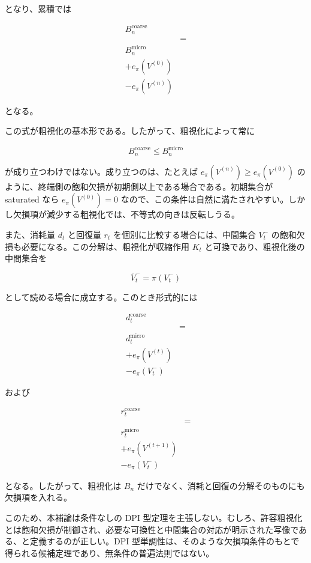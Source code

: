 \documentclass[12pt,a4paper]{article}
\begin{document}
となり、累積では

\[
\begin{aligned}
B_{n}^{\mathrm{coarse}} \\
&= \\
B_{n}^{\mathrm{micro}} \\
+ e_\pi(V^{(0)}) \\
- e_\pi(V^{(n)})
\end{aligned}
\]

となる。

この式が粗視化の基本形である。したがって、粗視化によって常に

\[
B_{n}^{\mathrm{coarse}} \le B_{n}^{\mathrm{micro}}
\]

が成り立つわけではない。成り立つのは、たとえば \(e_\pi(V^{(n)})\ge e_\pi(V^{(0)})\) のように、終端側の飽和欠損が初期側以上である場合である。初期集合が saturated なら \(e_\pi(V^{(0)})=0\) なので、この条件は自然に満たされやすい。しかし欠損項が減少する粗視化では、不等式の向きは反転しうる。

また、消耗量 \(d_{t}\) と回復量 \(r_{t}\) を個別に比較する場合には、中間集合 \(V_{t}^-\) の飽和欠損も必要になる。この分解は、粗視化が収縮作用 \(K_{t}\) と可換であり、粗視化後の中間集合を

\[
\bar V_{t}^-=\pi(V_{t}^-)
\]

として読める場合に成立する。このとき形式的には

\[
\begin{aligned}
d_{t}^{\mathrm{coarse}} \\
&= \\
d_{t}^{\mathrm{micro}} \\
+ e_\pi(V^{(t)}) \\
- e_\pi(V_{t}^-)
\end{aligned}
\]

および

\[
\begin{aligned}
r_{t}^{\mathrm{coarse}} \\
&= \\
r_{t}^{\mathrm{micro}} \\
+ e_\pi(V^{(t+1)}) \\
- e_\pi(V_{t}^-)
\end{aligned}
\]

となる。したがって、粗視化は \(B_{n}\) だけでなく、消耗と回復の分解そのものにも欠損項を入れる。

このため、本補論は条件なしの DPI 型定理を主張しない。むしろ、許容粗視化とは飽和欠損が制御され、必要な可換性と中間集合の対応が明示された写像である、と定義するのが正しい。DPI 型単調性は、そのような欠損項条件のもとで得られる候補定理であり、無条件の普遍法則ではない。
\end{document}
